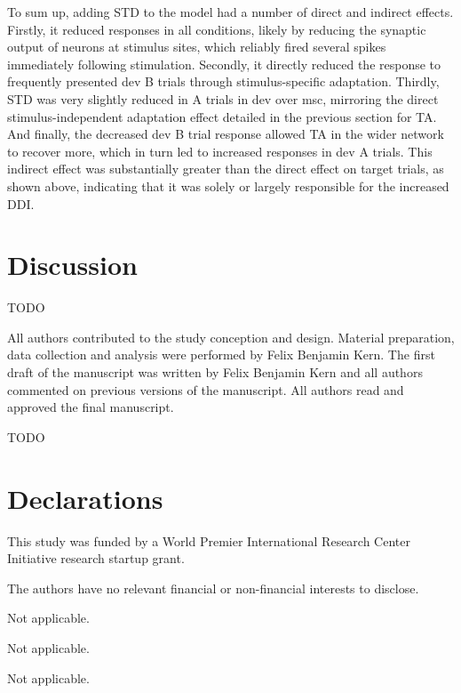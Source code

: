 \documentclass[pdflatex,referee,iicol,sn-basic]{sn-jnl}
\theoremstyle{thmstyleone}%
\theoremstyle{thmstyletwo}%
\theoremstyle{thmstylethree}%
\begin{document}
To sum up, adding STD to the model had a number of direct and indirect effects. Firstly, it reduced responses in all conditions, likely by reducing the synaptic output of neurons at stimulus sites, which reliably fired several spikes immediately following stimulation. Secondly, it directly reduced the response to frequently presented dev B trials through stimulus-specific adaptation. Thirdly, STD was very slightly reduced in A trials in dev over msc, mirroring the direct stimulus-independent adaptation effect detailed in the previous section for TA. And finally, the decreased dev B trial response allowed TA in the wider network to recover more, which in turn led to increased responses in dev A trials. This indirect effect was substantially greater than the direct effect on target trials, as shown above, indicating that it was solely or largely responsible for the increased DDI.

\section{Discussion}\label{sec-discussion}






\backmatter

TODO

All authors contributed to the study conception and design. Material preparation, data collection and analysis were performed by Felix Benjamin Kern. The first draft of the manuscript was written by Felix Benjamin Kern and all authors commented on previous versions of the manuscript. All authors read and approved the final manuscript.

TODO

\section*{Declarations}

This study was funded by a World Premier International Research Center Initiative research startup grant.

The authors have no relevant financial or non-financial interests to disclose.

Not applicable.

Not applicable.

Not applicable.
\end{document}
